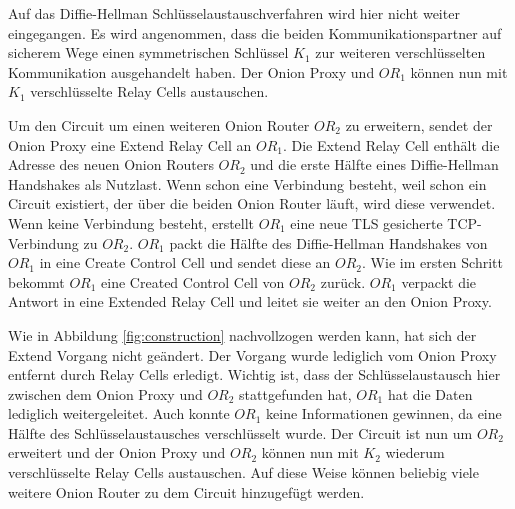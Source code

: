 \documentclass[fleqn,envcountsame,runningheads,10pt,a4paper]{llncs}
\begin{document}
Auf das Diffie-Hellman Schlüsselaustauschverfahren \cite{dh} wird hier nicht weiter eingegangen. Es wird angenommen, dass die beiden Kommunikationspartner auf sicherem Wege einen symmetrischen Schlüssel $K_1$ zur weiteren verschlüsselten Kommunikation ausgehandelt haben. Der Onion Proxy und $\textit{OR}_1$ können nun mit $K_1$ verschlüsselte Relay Cells austauschen. 

Um den Circuit um einen weiteren Onion Router $\textit{OR}_2$ zu erweitern, sendet der Onion Proxy eine Extend Relay Cell an $\textit{OR}_1$. Die Extend Relay Cell enthält die Adresse des neuen Onion Routers $\textit{OR}_2$ und die erste Hälfte eines Diffie-Hellman Handshakes als Nutzlast. Wenn schon eine Verbindung besteht, weil schon ein Circuit existiert, der über die beiden Onion Router läuft, wird diese verwendet. Wenn keine Verbindung besteht, erstellt $\textit{OR}_1$ eine neue TLS\cite{rfc:tls} gesicherte TCP-Verbindung zu $\textit{OR}_2$. $\textit{OR}_1$ packt die Hälfte des Diffie-Hellman Handshakes von $\textit{OR}_1$ in eine Create Control Cell und sendet diese an $\textit{OR}_2$. Wie im ersten Schritt bekommt $\textit{OR}_1$ eine Created Control Cell von $\textit{OR}_2$ zurück. $\textit{OR}_1$ verpackt die Antwort in eine Extended Relay Cell und leitet sie weiter an den Onion Proxy.

\begin{figure}[h]
\end{figure}

Wie in Abbildung \ref{fig:construction} nachvollzogen werden kann, hat sich der Extend Vorgang nicht geändert. Der Vorgang wurde lediglich vom Onion Proxy entfernt durch Relay Cells erledigt. Wichtig ist, dass der Schlüsselaustausch hier zwischen dem Onion Proxy und $\textit{OR}_2$ stattgefunden hat, $\textit{OR}_1$ hat die Daten lediglich weitergeleitet. Auch konnte $\textit{OR}_1$ keine Informationen gewinnen, da eine Hälfte des Schlüsselaustausches verschlüsselt wurde. Der Circuit ist nun um $\textit{OR}_2$ erweitert und der Onion Proxy und $\textit{OR}_2$ können nun mit $K_2$ wiederum verschlüsselte Relay Cells austauschen. Auf diese Weise können beliebig viele weitere Onion Router zu dem Circuit hinzugefügt werden.
\end{document}
